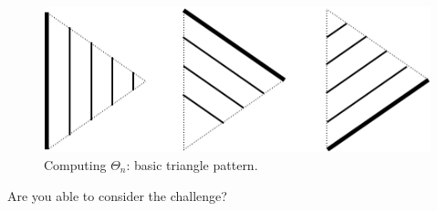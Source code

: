 \begin{figure}[h]
\begin{center}
        \includegraphics[scale=0.35]{FiguresArithmetic/appTetrahedral6}
        \caption{Computing $\Theta_n$: basic triangle pattern.}
        \label{fig:Tetrahedral6}
\end{center}
\end{figure}

Are you able to consider the challenge?



